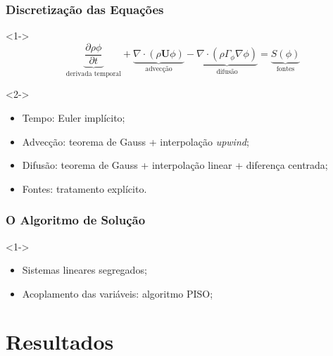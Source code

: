 \documentclass[bars,mathserif]{beamer}
\newcommand{\bv}[1]{\mathbf{#1}}
\begin{document}
\begin{frame}
\frametitle{Discretização das Equações}
\begin{block}<1->{}
\begin{equation*}
 \underbrace{\frac{\partial \rho \phi}{\partial t}}_{\text{derivada temporal}} + \underbrace{\nabla \cdot \left(\rho \bv{U} \phi \right)}_{\text{advecção}} - \underbrace{\nabla \cdot \left( \rho \Gamma_{\phi} \nabla \phi \right)}_{\text{difusão}} = \underbrace{S\left(\phi\right)}_{\text{fontes}}
\end{equation*}
\end{block}
\begin{block}<2->{}
\begin{itemize}
  \item<2-> Tempo: Euler implícito;
  \item<3-> Advecção: teorema de Gauss + interpolação \textit{upwind};
  \item<4-> Difusão: teorema de Gauss + interpolação linear + diferença centrada;
  \item<5-> Fontes: tratamento explícito.
\end{itemize}
\end{block}
\end{frame}
%
\begin{frame}
\frametitle{O Algoritmo de Solução}
\begin{block}<1->{}
\begin{itemize}
  \item<2-> Sistemas lineares segregados;
  \item<3-> Acoplamento das variáveis: algoritmo PISO;
\end{itemize}
\end{block}
\end{frame}
%
\section{Resultados}
\frame{\tableofcontents[currentsection]}
\end{document}
